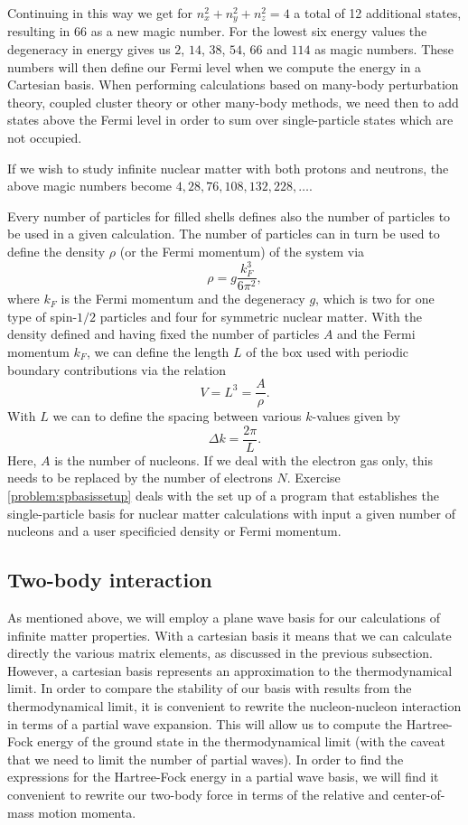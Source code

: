 Continuing in this way we get for $n_{x}^{2}+n_{y}^{2}+n_{z}^{2}=4$ a
total of 12 additional states, resulting in $66$ as a new magic
number. For the lowest six energy values the degeneracy in energy
gives us $2$, $14$, $38$, $54$, $66$ and $114$ as magic numbers. These
numbers will then define our Fermi level when we compute the energy in
a Cartesian basis. When performing calculations based on many-body
perturbation theory, coupled cluster theory or other many-body
methods, we need then to add states above the Fermi level in order to
sum over single-particle states which are not occupied.

If we wish to study infinite nuclear matter with both protons and
neutrons, the above magic numbers become $4, 28, 76, 108, 132, 228,
\dots$.

Every number of particles for filled shells defines also the number of
particles to be used in a given calculation. The number of particles
can in turn be used to define the density $\rho$ (or the Fermi momentum)
of the system via
\[
\rho = g \frac{k_F^3}{6\pi^2},
\]
where $k_F$ is the Fermi momentum and the degeneracy $g$, which is two
for one type of spin-$1/2$ particles and four for symmetric nuclear
matter.  With the density defined and having fixed the number of
particles $A$ and the Fermi momentum $k_F$, we can define the length
$L$ of the box used with periodic boundary contributions via the
relation
\[
  V= L^3= \frac{A}{\rho}.
\]
With $L$ we can to define the spacing between various
$k$-values given by
\[
  \Delta k = \frac{2\pi}{L}.
\]
Here, $A$ is the number of nucleons. If we deal with the electron
gas only, this needs to be replaced by the number of electrons $N$.
Exercise \ref{problem:spbasissetup} deals with the set up of a program
that establishes the single-particle basis for nuclear matter
calculations with input a given number of nucleons and a user
specificied density or Fermi momentum. 

\subsection{Two-body interaction}

As mentioned above, we will employ a plane wave basis for our
calculations of infinite matter properties. With a cartesian basis it
means that we can calculate directly the various matrix elements, as
discussed in the previous subsection. However, a cartesian basis
represents an approximation to the thermodynamical limit. In order to
compare the stability of our basis with results from the
thermodynamical limit, it is convenient to rewrite the nucleon-nucleon
interaction in terms of a partial wave expansion. This will allow us
to compute the Hartree-Fock energy of the ground state in the
thermodynamical limit (with the caveat that we need to limit the
number of partial waves). In order to find the expressions for the
Hartree-Fock energy in a partial wave basis, we will find it
convenient to rewrite our two-body force in terms of the relative and
center-of-mass motion momenta.

